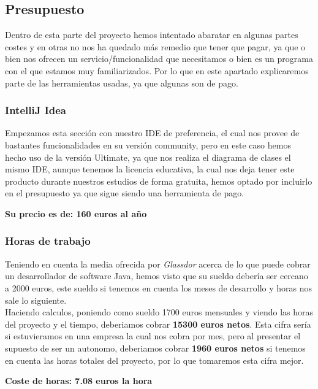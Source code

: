 \documentclass[a4paper]{article}
\begin{document}
\subsection{Presupuesto}

Dentro de esta parte del proyecto hemos intentado abaratar en algunas partes costes y en otras no nos ha quedado más remedio que tener que pagar, ya que o bien nos ofrecen un servicio/funcionalidad que necesitamos o bien es un programa con el que estamos muy familiarizados. Por lo que en este apartado explicaremos parte de las herramientas usadas, ya que algunas son de pago. \\
\subsubsection{IntelliJ Idea}
Empezamos esta sección con nuestro IDE de preferencia, el cual nos provee de bastantes funcionalidades en su versión community, pero en este caso hemos hecho uso de la versión Ultimate, ya que nos realiza el diagrama de clases el mismo IDE, aunque tenemos la licencia educativa, la cual nos deja tener este producto durante nuestros estudios de forma gratuita, hemos optado por incluirlo en el presupuesto ya que sigue siendo una herramienta de pago. \\
\begin{flushright}
    \bf Su precio es de: 160 euros al año
\end{flushright}

\subsubsection{Horas de trabajo}
Teniendo en cuenta la media ofrecida por \textit{Glassdor} acerca de lo que puede cobrar un desarrollador de software Java, hemos visto que su sueldo debería ser cercano a 2000 euros, este sueldo si tenemos en cuenta los meses de desarrollo y horas nos sale lo siguiente.\\
Haciendo calculos, poniendo como sueldo 1700 euros mensuales y viendo las horas del proyecto y el tiempo, deberiamos cobrar \textbf{15300 euros netos}. Esta cifra sería si estuvieramos en una empresa la cual nos cobra por mes, pero al presentar el supuesto de ser un autonomo, deberiamos cobrar \textbf{1960 euros netos} si tenemos en cuenta las horas totales del proyecto, por lo que tomaremos esta cifra mejor.
\begin{flushright}
    \bf Coste de horas: 7.08 euros la hora
\end{flushright}
\end{document}
